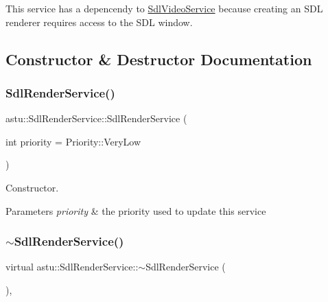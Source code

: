 This service has a depencendy to \hyperlink{classastu_1_1SdlVideoService}{Sdl\+Video\+Service} because creating an S\+DL renderer requires access to the S\+DL window. 

\subsection{Constructor \& Destructor Documentation}
\mbox{\label{classastu_1_1SdlRenderService_a4ec0b0ae88700604b6c6502ba56b8e09}} 
\subsubsection{\texorpdfstring{Sdl\+Render\+Service()}{SdlRenderService()}}
{\footnotesize\ttfamily astu\+::\+Sdl\+Render\+Service\+::\+Sdl\+Render\+Service (\begin{DoxyParamCaption}\item[{int}]{priority = {\ttfamily Priority\+:\+:VeryLow} }\end{DoxyParamCaption})}

Constructor.


\begin{DoxyParams}{Parameters}
{\em priority} & the priority used to update this service \\
\hline
\end{DoxyParams}
\mbox{\label{classastu_1_1SdlRenderService_a0ec8c27982cfa6ace6b28e50fba78f2a}} 
\subsubsection{\texorpdfstring{$\sim$\+Sdl\+Render\+Service()}{~SdlRenderService()}}
{\footnotesize\ttfamily virtual astu\+::\+Sdl\+Render\+Service\+::$\sim$\+Sdl\+Render\+Service (\begin{DoxyParamCaption}{ }\end{DoxyParamCaption})\hspace{0.3cm}{\ttfamily [inline]}, {\ttfamily [virtual]}}

